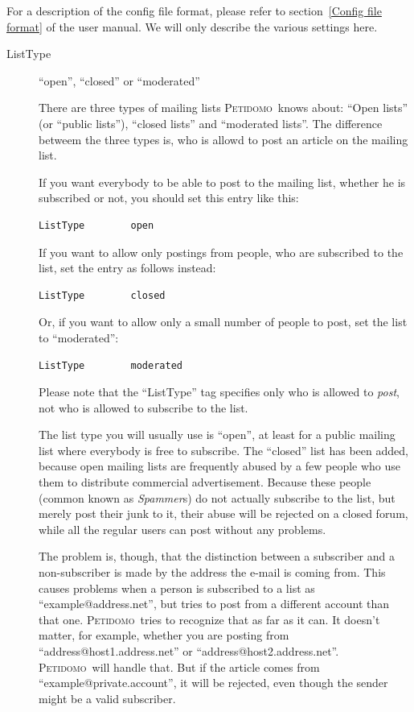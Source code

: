 \documentclass[a4paper]{report}
\newcommand{\Petidomo}{{\scshape Peti\-domo}}
\newcommand{\Def}[1]{{\index{#1}\sl #1}}
\begin{document}
For a description of the config file format, please refer to
section~\ref{Config file format} of the user manual. We will only
describe the various settings here.

\begin{description}

\item[ListType] \hfill ``open'', ``closed'' or ``moderated''

There are three types of mailing lists \Petidomo\ knows about: ``Open
lists'' (or ``public lists''), ``closed lists'' and ``moderated
lists''. The difference betweem the three types is, who is allowd to
post an article on the mailing list.

If you want everybody to be able to post to the mailing list, whether
he is subscribed or not, you should set this entry like this:
\begin{verbatim}
ListType        open
\end{verbatim}

If you want to allow only postings from people, who are subscribed to
the list, set the entry as follows instead:
\begin{verbatim}
ListType        closed
\end{verbatim}

Or, if you want to allow only a small number of people to post, set
the list to ``moderated'':
\begin{verbatim}
ListType        moderated
\end{verbatim}

Please note that the ``ListType'' tag specifies only who is allowed to
\emph{post}, not who is allowed to subscribe to the list.

The list type you will usually use is ``open'', at least for a public
mailing list where everybody is free to subscribe. The ``closed'' list
has been added, because open mailing lists are frequently abused by a
few people who use them to distribute commercial advertisement.
Because these people (common known as \Def{Spammer}s) do not actually
subscribe to the list, but merely post their junk to it, their abuse
will be rejected on a closed forum, while all the regular users can
post without any problems.

The problem is, though, that the distinction between a subscriber and
a non-subscriber is made by the address the e-mail is coming from.
This causes problems when a person is subscribed to a list as
``example@address.net'', but tries to post from a different account
than that one. \Petidomo\ tries to recognize that as far as it can.
It doesn't matter, for example, whether you are posting from
``address@host1.address.net'' or ``address@host2.address.net''.
\Petidomo\ will handle that. But if the article comes from
``example@private.account'', it will be rejected, even though the
sender might be a valid subscriber.


\end{description}
\end{document}
